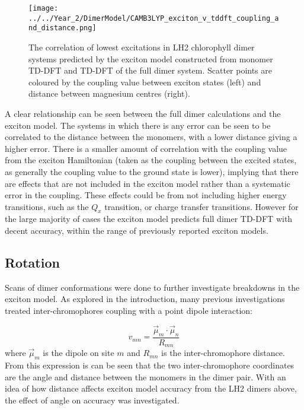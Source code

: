 \begin{figure}
    \centering
    \texttt{[image: ../../Year\_2/DimerModel/CAMB3LYP\_exciton\_v\_tddft\_coupling\_and\_distance.png]}
    \caption{The correlation of lowest excitations in LH2 chlorophyll dimer systems
    predicted by the exciton model constructed from monomer TD-DFT and TD-DFT of
    the full dimer system. Scatter points are coloured by the coupling value between
    exciton states (left) and distance between magnesium centres (right).}
    \label{fig:camb3lyp_excitons}
\end{figure}

A clear relationship can be seen between the full dimer calculations and the exciton
model. The systems in which there is any error can be seen to be correlated to the
distance between the monomers, with a lower distance giving a higher error. There 
is a smaller amount of correlation with the coupling value from the exciton Hamiltonian
(taken as the coupling between the excited states, as generally the coupling value
to the ground state is lower), implying that there are effects that are not included
in the exciton model rather than a systematic error in the coupling. These effects
could be from not including higher energy transitions, such as the $Q_x$ transition,
or charge transfer transitions. However for the large majority of cases the exciton
model predicts full dimer TD-DFT with decent accuracy, within the range of previously
reported exciton models.

\subsection{Rotation}
\label{subsec:rotation}

Scans of dimer conformations were done to further investigate breakdowns in the
exciton model. As explored in the introduction, many previous investigations treated
inter-chromophores coupling with a point dipole interaction:

\begin{equation}
    v_{mn} = \frac{\vec{\mu}_m \cdot \vec{\mu}_n}{R_{mn}}
\end{equation}
%
where $\vec{\mu}_m$ is the dipole on site $m$ and $R_{mn}$ is the inter-chromophore
distance. From this expression is can be seen that the two inter-chromophore coordinates
are the angle and distance between the monomers in the dimer pair. With an idea
of how distance affects exciton model accuracy from the LH2 dimers above, the effect 
of angle on accuracy was investigated.

